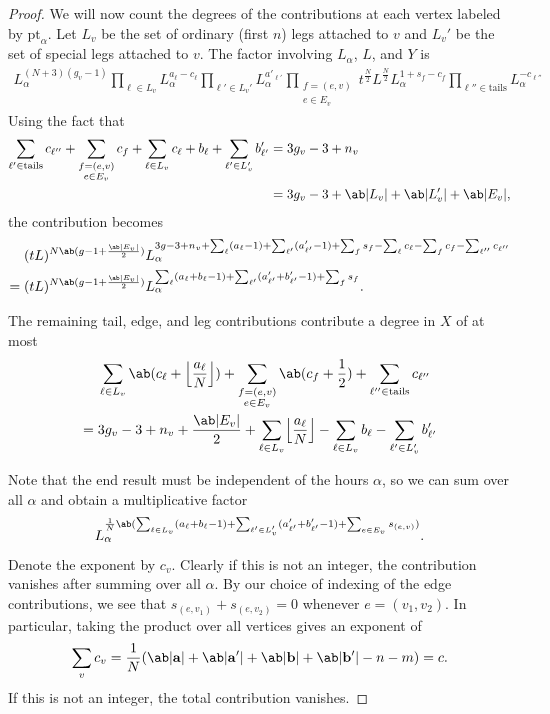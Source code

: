 \documentclass[10pt]{amsart}
\DeclarePairedDelimiter{\floor}{\lfloor}{\rfloor}
\theoremstyle{definition}
\theoremstyle{remark}
\theoremstyle{plain}
\theoremstyle{definition}
\theoremstyle{remark}
\newcommand{\ba}{\mathbf{a}}
\newcommand{\bb}{\mathbf{b}}
\newcommand{\mr}[1]{\mathrm{#1}}
\newcommand{\1}{\mathbf{1}}
\newcommand{\2}{\mathbf{2}}
\newcommand{\3}{\mathbf{3}}
\newcommand{\pt}{\mr{pt}}
\numberwithin{equation}{section}
\begin{document}
\begin{proof}
    We will now count the degrees of the contributions at each vertex labeled by $\pt_{\alpha}$. Let $L_v$ be the set of ordinary (first $n$) legs attached to $v$ and $L_v'$ be the set of special legs attached to $v$. The factor involving $L_{\alpha}$, $L$, and $Y$ is
    \begin{align*}
        L_{\alpha}^{(N+3)(g_v-1)} \prod_{\ell \in L_v} L_{\alpha}^{a_{\ell}-c_{\ell}} \prod_{\ell' \in L_v'} L_{\alpha}^{a'_{\ell'}} \prod_{\substack{f =(e,v)\\e \in E_v}} t^{\frac{N}{2}} L^{\frac{N}{2}} L_{\alpha}^{1+s_f-c_f} \prod_{\ell'' \in \mr{tails}} L_{\alpha}^{-c_{\ell''}}
    \end{align*}
    Using the fact that
    \begin{align*}
        \sum_{\ell' \in \mr{tails}} c_{\ell''} + \sum_{\substack{f = (e,v) \\ e \in E_v}} c_f + \sum_{\ell \in L_v} c_{\ell} + b_{\ell} + \sum_{\ell' \in L_v'} b'_{\ell'} &= 3g_v - 3 + n_v  \\
        &= 3g_v -3 + \ab|L_v| + \ab|L_v'| + \ab|E_v|,
    \end{align*}
    the contribution becomes
    \begin{align*}
        & (tL)^{N\ab(g-1 + \frac{\ab|E_v|}{2})} L_{\alpha}^{3g-3+n_v + \sum_{\ell} (a_{\ell}-1) + \sum_{\ell'} (a'_{\ell'}-1) + \sum_f s_f - \sum_{\ell} c_{\ell} -\sum_f c_f - \sum_{\ell''} c_{\ell''}} \\
        ={}& (tL)^{N\ab(g-1+\frac{\ab|E_v|}{2})} L_{\alpha}^{\sum_{\ell} (a_{\ell}+b_{\ell}-1) + \sum_{\ell'} (a'_{\ell'} + b'_{\ell'}-1) + \sum_f s_f}.
    \end{align*}
    
    The remaining tail, edge, and leg contributions contribute a degree in $X$ of at most
    \begin{align*}
        & \sum_{\ell \in L_v} \ab(c_{\ell} + \floor*{\frac{a_{\ell}}{N}}) + \sum_{\substack{f = (e,v) \\ e \in E_v}} \ab(c_f + \frac{1}{2}) + \sum_{\ell'' \in \mr{tails}} c_{\ell''} \\
        ={}& 3g_v - 3 + n_v + \frac{\ab|E_v|}{2} + \sum_{\ell \in L_v} \floor*{\frac{a_{\ell}}{N}} - \sum_{\ell \in L_v} b_{\ell} - \sum_{\ell' \in L_v'} b'_{\ell'}
    \end{align*}
    
    Note that the end result must be independent of the hours $\alpha$, so we can sum over all $\alpha$ and obtain a multiplicative factor
    \[ L_{\alpha}^{\frac{1}{N}\ab(\sum_{\ell \in L_v}(a_{\ell}+b_{\ell}-1) + \sum_{\ell' \in L_v'} (a'_{\ell'} + b'_{\ell'}-1) + \sum_{e \in E_v} s_{(e,v)})}. \]
    Denote the exponent by $c_v$. Clearly if this is not an integer, the contribution vanishes after summing over all $\alpha$. By our choice of indexing of the edge contributions, we see that $s_{(e,v_1)} + s_{(e,v_2)} = 0$ whenever $e = (v_1, v_2)$. In particular, taking the product over all vertices gives an exponent of
    \[ \sum_v c_v = \frac{1}{N} (\ab|\ba| + \ab|\ba'| + \ab|\bb| + \ab|\bb'| - n-m) = c. \]
    If this is not an integer, the total contribution vanishes.


\end{proof}
\end{document}
